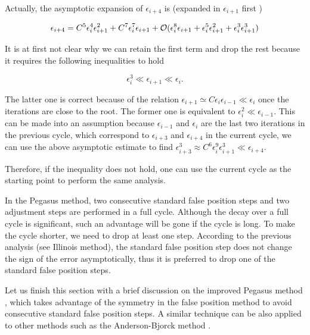 \begin{remark}
\label{REM: 0-CO-PE-AS}
Actually, the asymptotic expansion of $\epsilon_{i+4}$ is (expanded in $\epsilon_{i+1}$ first )

$$
\epsilon_{i+4} = C^5 \epsilon_{i}^4\epsilon_{i+1}^2 + C^7 \epsilon_i^7\epsilon_{i+1}
+ \mathcal O(\epsilon_{i}^8 \epsilon_{i+1} + \epsilon_{i}^5 \epsilon_{i+1}^2 + \epsilon_{i}^3 \epsilon_{i+1}^3)$$

It is at first not clear why we can retain the first term and drop the rest because it requires the following inequalities to hold

$$\epsilon_{i}^3 \ll \epsilon_{i+1}\ll \epsilon_i.$$

The latter one is correct because of the relation $\epsilon_{i+1} \simeq C \epsilon_{i}\epsilon_{i-1} \ll \epsilon_i$ once the iterations are close to the root. The former one is equivalent to $\epsilon_{i}^2 \ll \epsilon_{i-1}$. This can be made into an assumption because $\epsilon_{i-1}$ and $\epsilon_{i}$ are the last two iterations in the previous cycle, which correspond to $\epsilon_{i+3}$ and $\epsilon_{i+4}$ in the current cycle, we can use the above asymptotic estimate to find $\epsilon_{i+3}^3 \approx C^6 \epsilon_{i}^9 \epsilon_{i+1}^3 \ll \epsilon_{i+4}$. 

Therefore, if the inequality does not hold, one can use the current cycle as the starting point to perform the same analysis.
\end{remark}

In the Pegasus method, two consecutive standard false position steps and two adjustment steps are performed in a full cycle. Although the decay over a full cycle is significant, such an advantage will be gone if the cycle is long. To make the cycle shorter, we need to drop at least one step. According to the previous analysis (see Illinois method), the standard false position step does not change the sign of the error asymptotically, thus it is preferred to drop one of the standard false position steps.

Let us finish this section with a brief discussion on the improved Pegasus method \cite{king1973improved}, which takes advantage of the symmetry in the false position method to avoid consecutive standard false position steps. A similar technique can be also applied to other methods such as the Anderson-Bjorck method \cite{anderson1973new}.

